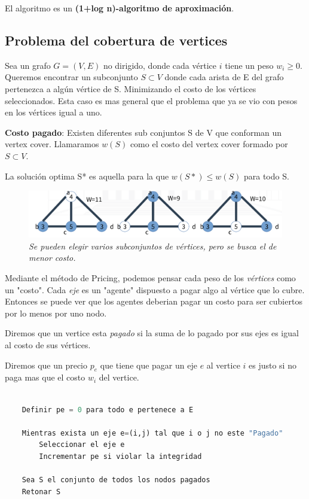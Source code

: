 \documentclass{article}
\begin{document}
El algoritmo es un \textbf{(1+log n)-algoritmo de aproximación}.





\newpage
\subsection{Problema del cobertura de vertices}

Sea un grafo \(G=(V,E)\) no dirigido, donde cada vértice \(i\) tiene un peso \(w_i \geq 0\).
Queremos encontrar un subconjunto \(S \subset V\) donde cada arista de E del grafo
pertenezca a algún vértice de S.
Minimizando el costo de los vértices seleccionados.
Esta caso es mas general que el problema que ya se vio con pesos en los vértices igual a uno. 

\textbf{Costo pagado}: Existen diferentes sub conjuntos S de V que conforman un vertex cover.
Llamaramos \(w(S)\) como el costo del vertex cover formado por  \(S \subset V\).

La solución optima S* es aquella para la que \(w(S*) \leq w(S)\) para todo S.

\begin{figure}[h!]
    \begin{center} 
    \includegraphics[width=\linewidth]{imagenes/problema-aprox-vertexcover.png}
    \caption{\small \sl Se pueden elegir varios subconjuntos de vértices, pero se busca el de menor costo.} 
    \end{center}
\end{figure}

Mediante el método de Pricing, podemos pensar cada peso de los \textit{vértices} como un "costo".
Cada \textit{eje} es un "agente" dispuesto a pagar algo al vértice que lo cubre. Entonces se puede ver 
que los agentes deberian pagar un costo para ser cubiertos por lo menos por uno nodo.

Diremos que un vertice esta \textit{pagado} si la suma de lo pagado por sus ejes es igual al costo de sus vértices.

Diremos que un precio \(p_e\) que tiene que pagar un eje \(e\) al vertice \(i \) es justo si no paga 
mas que el costo \(w_i\) del vertice.


\begin{lstlisting}[language=Python, caption=Algoritmo de aproximación greedy. La integridad se respeta si se paga el precio justo.]
    
    Definir pe = 0 para todo e pertenece a E

    Mientras exista un eje e=(i,j) tal que i o j no este "Pagado"
        Seleccionar el eje e
        Incrementar pe si violar la integridad
    
    Sea S el conjunto de todos los nodos pagados
    Retonar S

\end{lstlisting}   
\end{document}

